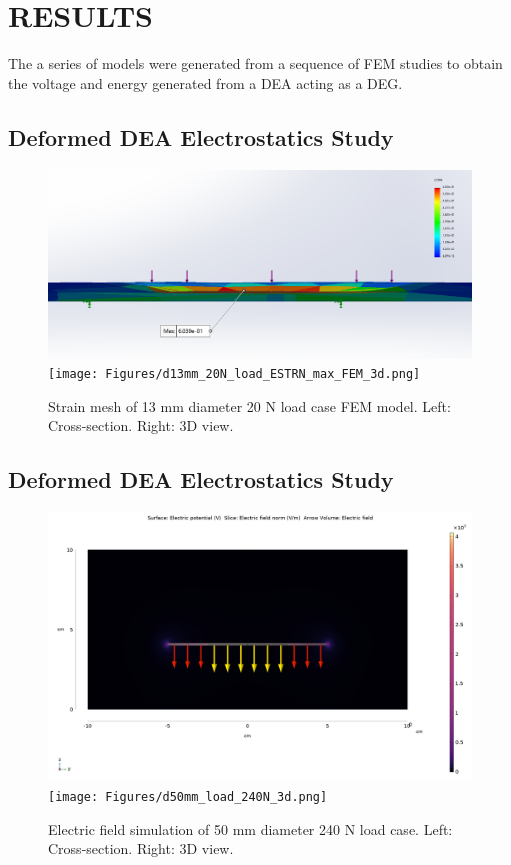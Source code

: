 \section{RESULTS}
\label{sec:results}
The a series of models were generated from a sequence of FEM studies to obtain the voltage and energy generated from a DEA acting as a DEG.

\subsection{Deformed DEA Electrostatics Study}
\begin{figure}[H]
	\centering
	\includegraphics[width=0.6\linewidth]{Figures/d13mm_20N_load_ESTRN_max_FEM.png}
	\texttt{[image: Figures/d13mm\_20N\_load\_ESTRN\_max\_FEM\_3d.png]}
	\caption{Strain mesh of 13 mm diameter 20 N load case FEM model. Left: Cross-section. Right: 3D view.}
	\label{fig:FEM_DEA-EIT_loading}
\end{figure}


\subsection{Deformed DEA Electrostatics Study}
\begin{figure}[H]
	\centering
	\includegraphics[width=0.6\linewidth]{Figures/d50mm_load_240N.png}
	\texttt{[image: Figures/d50mm\_load\_240N\_3d.png]}
	\caption{Electric field simulation of 50 mm diameter 240 N load case. Left: Cross-section. Right: 3D view.}
	\label{fig:FEM_DEA-EIT_cap}
\end{figure}


